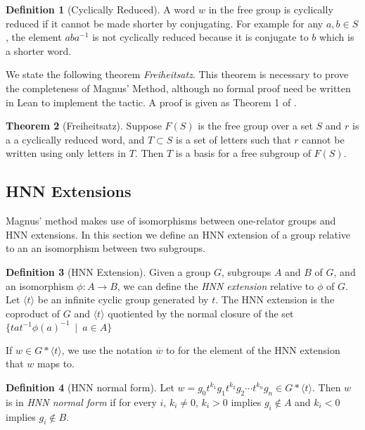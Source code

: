 \documentclass[12pt]{article} %
\theoremstyle{definition}
\newtheorem{thm}{Theorem}[subsubsection]
\theoremstyle{definition}
\theoremstyle{definition}
\theoremstyle{definition}
\newtheorem{defn}[thm]{Definition}
\begin{document}
\begin{defn}[Cyclically Reduced]\label{cycred}
  A word $w$ in the free group is cyclically reduced if it cannot be made shorter
  by conjugating. For example for any $a, b \in S$,
  the element $aba^{-1}$ is not cyclically reduced
  because it is conjugate to $b$ which is a shorter word.
\end{defn}

We state the following theorem \textit{Freiheitsatz}. This theorem
is necessary to prove the completeness of Magnus' Method, although no formal
proof need be written in Lean to implement the tactic. A proof
is given as Theorem 1 of \cite{mccool_schupp_1973}.

\begin{thm}[Freiheitsatz]\label{freiheitsatz}
  Suppose $F(S)$ is the free group over a set $S$ and $r$ is a a cyclically reduced
  word, and $T \subset S$ is a set of letters such that $r$ cannot be written
  using only letters in $T$. Then $T$ is a basis for a free subgroup of $F(S)$.
\end{thm}

\subsection{HNN Extensions}\label{HNN}

Magnus' method makes use of isomorphisms between one-relator groups and HNN extensions.
In this section we define an HNN extension of a group relative to an
an isomorphism between two subgroups.

\begin{defn}[HNN Extension]
  Given a group $G$, subgroups $A$ and $B$ of $G$, and an isomorphism $\phi: A \to B$, we can define
  the \textit{HNN extension} relative to $\phi$ of $G$. Let $\langle t \rangle$ be an infinite cyclic
  group generated by $t$. The HNN extension is the coproduct
  of $G$ and $\langle t \rangle$ quotiented
  by the normal closure of the set $\{ta t^{-1} \phi(a)^{-1} \ \mid \ a \in A\}$
\end{defn}

If $w \in G \ast \langle t \rangle$, we use the notation $\overline{w}$ to
for the element of the HNN extension that $w$ maps to.

\begin{defn}[HNN normal form]\label{HNNnormalform}
  Let $w = g_0t^{k_1}g_1t^{k_2}g_2 \cdots t^{k_n}g_n \in G \ast \langle t \rangle$.
  Then $w$ is in \textit{HNN normal form} if for every $i$, $k_i \ne 0$, $k_i > 0$
  implies $g_i \notin A$ and $k_i < 0$ implies $g_i \notin B$.
\end{defn}
\end{document}
